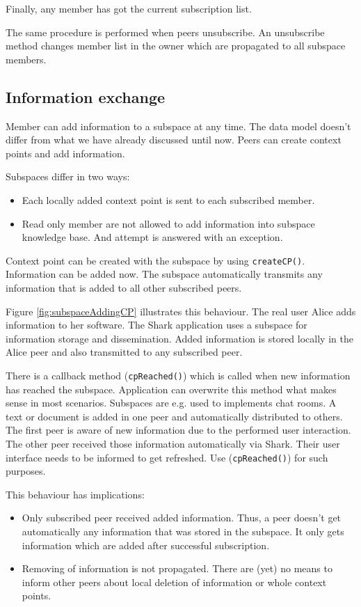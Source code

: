 Finally, any member has got the current subscription list.

The same procedure is performed when peers unsubscribe. An unsubscribe method changes member list in the owner which are propagated to all subspace members.

\subsection{Information exchange}
Member can add information to a subspace at any time. The data model doesn't differ from what we have already discussed until now. Peers can create context points and add information.

Subspaces differ in two ways: 

\begin{itemize}
\item 
Each locally added context point is sent
to each subscribed member.
\item 
Read only member are not allowed to add information into subspace knowledge
base. And attempt is answered with an exception.
\end{itemize}

Context point can be created with the subspace by using {\verb|createCP()|}. 
Information can be added now. The subspace automatically transmits any 
information that is added to all other subscribed peers.

Figure \ref{fig:subspaceAddingCP} illustrates this behaviour. The real user Alice adds information to her software. The Shark application uses a subspace for information storage and dissemination. Added information is stored locally in the Alice peer and also transmitted to any subscribed peer.

There is a callback method ({\verb|cpReached()|}) which is called when new
information has reached the subspace. Application can overwrite this method
what makes sense in most scenarios. Subspaces are e.g. used to implements 
chat rooms. A text or document is added in one peer and automatically 
distributed to others. The first peer is aware of new information due to
the performed user interaction. The other peer received those information
automatically via Shark. Their user interface needs to be informed to 
get refreshed. Use ({\verb|cpReached()|}) for such purposes.

This behaviour has implications:

\begin{itemize}
\item 
Only subscribed peer received added information. Thus, a peer doesn't get
automatically any information that was stored in the subspace. It only gets
information which are added after successful subscription.

\item 
Removing of information is not propagated. There are (yet) no means to inform
other peers about local deletion of information or whole context points.

\end{itemize}

